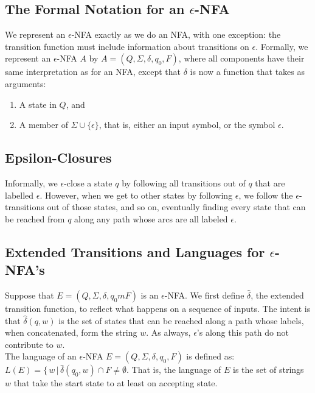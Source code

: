 \documentclass[]{article}
\begin{document}
  \subsection*{The Formal Notation for an $\epsilon$-NFA}
    We represent an $\epsilon$-NFA exactly as we do an NFA, with one 
    exception: the transition function must include information about 
    transitions on $\epsilon$. Formally, we represent an $\epsilon$-NFA $A$ by 
    $A = (Q, \Sigma, \delta, q_0, F)$, where all components have their same 
    interpretation as for an NFA, except that $\delta$ is now a function that 
    takes as arguments:
      \begin{enumerate}
        \item A state in $Q$, and
        \item A member of $\Sigma \cup \{\epsilon\}$, that is, either an input 
        symbol, or the symbol $\epsilon$.
      \end{enumerate}
  
  \subsection*{Epsilon-Closures}
    Informally, we $\epsilon$-close a state $q$ by following all transitions 
    out of $q$ that are labelled $\epsilon$. However, when we get to other 
    states by following $\epsilon$, we follow the $\epsilon$-transitions out 
    of those states, and so on, eventually finding every state that can be 
    reached from $q$ along any path whose arcs are all labeled $\epsilon$.
    
  \subsection*{Extended Transitions and Languages for $\epsilon$-NFA's}
    Suppose that $E = (Q, \Sigma, \delta, q_0m F)$ is an $\epsilon$-NFA. We 
    first define $\hat{\delta}$, the extended transition function, to reflect 
    what happens on a sequence of inputs. The intent is that $\hat{\delta}(q, 
    w)$ is the set of states that can be reached along a path whose labels, 
    when concatenated, form the string $w$. As always, $\epsilon$'s along this 
    path do not contribute to $w$. \\
    \indent The language of an $\epsilon$-NFA $E = (Q, \Sigma, \delta, q_0, F)
    $ is defined as: $L(E) = \{ \, w \, | \, \hat{\delta}(q_0, w) \cap F \neq 
    \emptyset$. That is, the language of $E$ is the set of strings $w$ that 
    take the start state to at least on accepting state.
    
\end{document}

